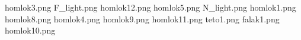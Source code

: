 homlok3.png
F_light.png
homlok12.png
homlok5.png
N_light.png
homlok1.png
homlok8.png
homlok4.png
homlok9.png
homlok11.png
teto1.png
falak1.png
homlok10.png
